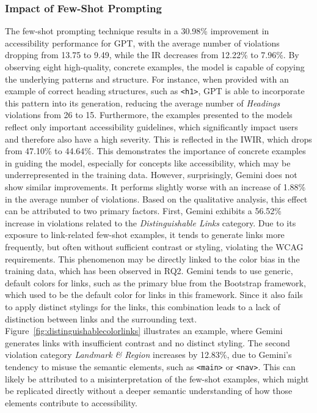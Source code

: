 \subsubsection{Impact of Few-Shot Prompting}
The few-shot prompting technique results in a 30.98\% improvement
in accessibility performance for GPT, with the average number 
of violations dropping from 13.75 to 9.49, while the IR 
decreases from 12.22\% to 7.96\%. By observing eight 
high-quality, concrete examples, the model is capable of 
copying the underlying patterns and structure. For instance,
when provided with an example of correct heading structures, such 
as \texttt{<h1>}, GPT is able to incorporate this pattern into its
generation, reducing the average number of \emph{Headings} violations 
from 26 to 15. Furthermore, the examples presented to the models
reflect only important accessibility guidelines, which 
significantly impact users and therefore also have a high 
severity. This is reflected in the IWIR, which drops from 
47.10\% to 44.64\%.
This demonstrates the importance of concrete 
examples in guiding the model, especially for concepts like
accessibility, which may be underrepresented in the training data.\newline
However, surprisingly, Gemini does not show similar improvements.
It performs slightly worse with an increase of 1.88\% in the average
number of violations. Based on the qualitative analysis, this
effect can be attributed to two primary factors. First, Gemini
exhibits a 56.52\% increase in violations related to the
\emph{Distinguishable Links} category. Due to its exposure
to link-related few-shot examples, it tends to generate links more 
frequently, but often without sufficient contrast or 
styling, violating the WCAG requirements. This phenomenon 
may be directly linked to the color bias in the training data,
which has been observed in RQ2. Gemini tends to use generic, default 
colors for links, such as the primary blue from the Bootstrap framework,
which used to be the default color for links in this framework. 
Since it also fails to apply distinct stylings for the links, this
combination leads to 
a lack of distinction between links and the surrounding text.
Figure~\ref{fig:distinguishablecolorlinks} illustrates an example, where 
Gemini generates links with insufficient contrast and no distinct styling.
\newline
The second violation category 
\emph{Landmark \& Region} increases by 12.83\%, due to 
Gemini's tendency to misuse the semantic 
elements, such as \texttt{<main>} or \texttt{<nav>}. This 
can likely be attributed to a misinterpretation of 
the few-shot examples, which might be replicated 
directly without a deeper semantic understanding of 
how those elements contribute to accessibility.

